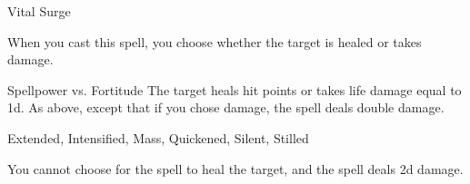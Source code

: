 \begin{spellsection}{Vital Surge}
\begin{spellcontent}
\begin{spelltargetinginfo}
\end{spelltargetinginfo}
\begin{spelleffects}
\spellspecial
When you cast this spell, you choose whether the target is healed or takes damage.
\begin{spellattack}{Spellpower vs. Fortitude}
\spellsuccess The target heals hit points or takes life damage equal to  \plus1d.
\spellcritical As above, except that if you chose damage, the spell deals double damage.
\end{spellattack}
\end{spelleffects}
\end{spellcontent}
\begin{spellfooter}
 Extended, Intensified, Mass, Quickened, Silent, Stilled
\end{spellfooter}
\begin{spellsubcontent}
\begin{spellcantrip}
You cannot choose for the spell to heal the target, and the spell deals \minus2d damage.
\end{spellcantrip}
\end{spellsubcontent}
\end{spellsection}
